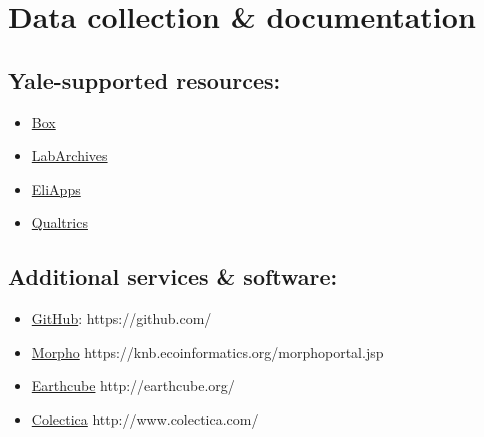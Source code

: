 \documentclass{tufte-handout}
\begin{document}
\section{Data collection \& documentation}\label{data-collection-documentation}

\subsection{Yale-supported resources:}\label{yale-supported}

\begin{itemize}
\item
  \href{http://its.yale.edu/services/collaboration-and-file-sharing/box-yale}{Box}
\item
  \href{http://its.yale.edu/services/research-technologies/elab-notebook/labarchives-faqs}{LabArchives}
\item
  \href{http://its.yale.edu/services/email-and-calendars/eliapps-google-apps-education}{EliApps}
\item
  \href{http://its.yale.edu/services/web-and-application-services/qualtrics-survey-tool}{Qualtrics}
\end{itemize}


\subsection{Additional services \& software:}\label{additional-services-software}

\begin{itemize}
\item
  \href{https://github.com/}{GitHub}: https://github.com/
\item
  \href{https://knb.ecoinformatics.org/morphoportal.jsp}{Morpho}
  https://knb.ecoinformatics.org/morphoportal.jsp 
\item
  \href{http://earthcube.org/}{Earthcube} http://earthcube.org/
\item
  \href{http://www.colectica.com/}{Colectica} http://www.colectica.com/
\end{itemize}

\end{document}
